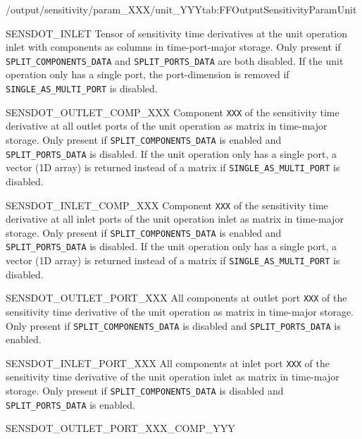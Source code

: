 \begin{groupscope}{/output/sensitivity/param\_XXX/unit\_YYY}{tab:FFOutputSensitivityParamUnit}
\begin{dataset}[type=double,unit={\si{\mol\per\cubic\metre\of{IV}\per\second\per\ParamUnit}}]{SENSDOT\_INLET}
    Tensor of sensitivity time derivatives at the unit operation inlet with components as columns in time-port-major storage.
    Only present if \texttt{SPLIT\_COMPONENTS\_DATA} and \texttt{SPLIT\_PORTS\_DATA} are both disabled.
    If the unit operation only has a single port, the port-dimension is removed if \texttt{SINGLE\_AS\_MULTI\_PORT} is disabled.
  \end{dataset}
  \begin{dataset}[type=double,unit={\si{\mol\per\cubic\metre\of{IV}\per\second\per\ParamUnit}}]{SENSDOT\_OUTLET\_COMP\_XXX}
    Component \texttt{XXX} of the sensitivity time derivative at all outlet ports of the unit operation as matrix in time-major storage.
    Only present if \texttt{SPLIT\_COMPONENTS\_DATA} is enabled and \texttt{SPLIT\_PORTS\_DATA} is disabled.
    If the unit operation only has a single port, a vector (1D array) is returned instead of a matrix if \texttt{SINGLE\_AS\_MULTI\_PORT} is disabled.
  \end{dataset}
  \begin{dataset}[type=double,unit={\si{\mol\per\cubic\metre\of{IV}\per\second\per\ParamUnit}}]{SENSDOT\_INLET\_COMP\_XXX}
    Component \texttt{XXX} of the sensitivity time derivative at all inlet ports of the unit operation inlet as matrix in time-major storage.
    Only present if \texttt{SPLIT\_COMPONENTS\_DATA} is enabled and \texttt{SPLIT\_PORTS\_DATA} is disabled.
    If the unit operation only has a single port, a vector (1D array) is returned instead of a matrix if \texttt{SINGLE\_AS\_MULTI\_PORT} is disabled.
  \end{dataset}
  \begin{dataset}[type=double,unit={\si{\mol\per\cubic\metre\of{IV}\per\second\per\ParamUnit}}]{SENSDOT\_OUTLET\_PORT\_XXX}
    All components at outlet port \texttt{XXX} of the sensitivity time derivative of the unit operation as matrix in time-major storage.
    Only present if \texttt{SPLIT\_COMPONENTS\_DATA} is disabled and \texttt{SPLIT\_PORTS\_DATA} is enabled.
  \end{dataset}
  \begin{dataset}[type=double,unit={\si{\mol\per\cubic\metre\of{IV}\per\second\per\ParamUnit}}]{SENSDOT\_INLET\_PORT\_XXX}
    All components at inlet port \texttt{XXX} of the sensitivity time derivative of the unit operation inlet as matrix in time-major storage.
    Only present if \texttt{SPLIT\_COMPONENTS\_DATA} is disabled and \texttt{SPLIT\_PORTS\_DATA} is enabled.
  \end{dataset}
  \begin{dataset}[type=double,unit={\si{\mol\per\cubic\metre\of{IV}\per\second\per\ParamUnit}}]{SENSDOT\_OUTLET\_PORT\_XXX\_COMP\_YYY}

\end{dataset}
\end{groupscope}
